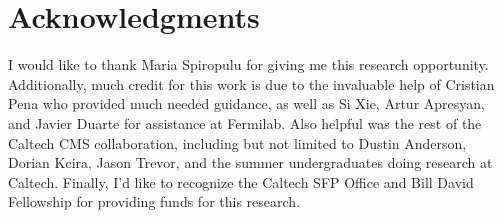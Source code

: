 \documentclass[twocolumn,aps,prd,reprint,superscriptaddress,floatfix]{revtex4-1}
\begin{document}
\section{Acknowledgments}
I would like to thank Maria Spiropulu for giving me this research opportunity. 
Additionally, much credit for this work is due to the invaluable help of Cristian Pena who provided much needed guidance, as well as Si Xie, Artur Apresyan, and Javier Duarte for assistance at Fermilab. 
Also helpful was the rest of the Caltech CMS collaboration, including but not limited to Dustin Anderson, Dorian Kcira, Jason Trevor, and the summer undergraduates doing research at Caltech.
Finally, I'd like to recognize the Caltech SFP Office and Bill David Fellowship for providing funds for this research.

\newpage

\nocite{*}

 
\end{document}

